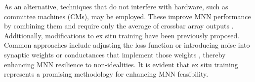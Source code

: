 

\noindent As an alternative, techniques that do not interfere with hardware, such as committee machines (CMs), may be employed. These improve MNN performance by combining them and require only the average of crossbar array outputs \cite{joksas2020committee}. Additionally, modifications to ex situ training have been previously proposed. Common approaches include adjusting the loss function \cite{zhu2020statistical} or introducing noise into synaptic weights \cite{he2019noise} or conductances that implement those weights \cite{joshi2020accurate}, thereby enhancing MNN resilience to non-idealities. It is evident that ex situ training represents a promising methodology for enhancing MNN feasibility.\\



